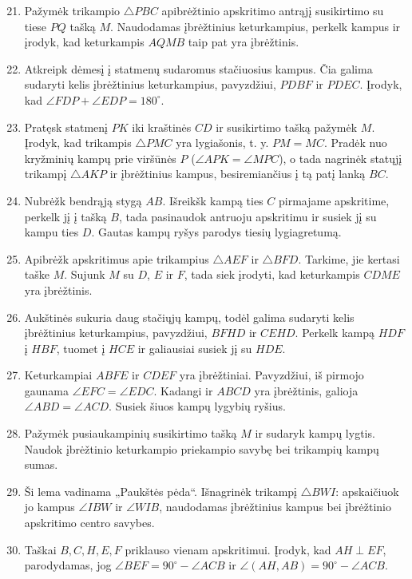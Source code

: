 \documentclass[11pt,a4paper]{scrartcl}
\begin{document}
\begin{enumerate}
    \setcounter{enumi}{20}
    \item Pažymėk trikampio $\triangle PBC$ apibrėžtinio apskritimo antrąjį susikirtimo su tiese $PQ$ tašką $M$. Naudodamas įbrėžtinius keturkampius, perkelk kampus ir įrodyk, kad keturkampis $AQMB$ taip pat yra įbrėžtinis.
    \item Atkreipk dėmesį į statmenų sudaromus stačiuosius kampus. Čia galima sudaryti kelis įbrėžtinius keturkampius, pavyzdžiui, $PDBF$ ir $PDEC$. Įrodyk, kad $\angle FDP+\angle EDP=180^\circ$.
    \item Pratęsk statmenį $PK$ iki kraštinės $CD$ ir susikirtimo tašką pažymėk $M$. Įrodyk, kad trikampis $\triangle PMC$ yra lygiašonis, t. y. $PM=MC$. Pradėk nuo kryžminių kampų prie viršūnės $P$ ($\angle APK=\angle MPC$), o tada nagrinėk statųjį trikampį $\triangle AKP$ ir įbrėžtinius kampus, besiremiančius į tą patį lanką $BC$.
    \item Nubrėžk bendrąją stygą $AB$. Išreikšk kampą ties $C$ pirmajame apskritime, perkelk jį į tašką $B$, tada pasinaudok antruoju apskritimu ir susiek jį su kampu ties $D$. Gautas kampų ryšys parodys tiesių lygiagretumą.
    \item Apibrėžk apskritimus apie trikampius $\triangle AEF$ ir $\triangle BFD$. Tarkime, jie kertasi taške $M$. Sujunk $M$ su $D$, $E$ ir $F$, tada siek įrodyti, kad keturkampis $CDME$ yra įbrėžtinis.
    \item Aukštinės sukuria daug stačiųjų kampų, todėl galima sudaryti kelis įbrėžtinius keturkampius, pavyzdžiui, $BFHD$ ir $CEHD$. Perkelk kampą $HDF$ į $HBF$, tuomet į $HCE$ ir galiausiai susiek jį su $HDE$.
    \item Keturkampiai $ABFE$ ir $CDEF$ yra įbrėžtiniai. Pavyzdžiui, iš pirmojo gaunama $\angle EFC=\angle EDC$. Kadangi ir $ABCD$ yra įbrėžtinis, galioja $\angle ABD=\angle ACD$. Susiek šiuos kampų lygybių ryšius.
    \item Pažymėk pusiaukampinių susikirtimo tašką $M$ ir sudaryk kampų lygtis. Naudok įbrėžtinio keturkampio priekampio savybę bei trikampių kampų sumas.
    \item Ši lema vadinama „Paukštės pėda“. Išnagrinėk trikampį $\triangle BWI$: apskaičiuok jo kampus $\angle IBW$ ir $\angle WIB$, naudodamas įbrėžtinius kampus bei įbrėžtinio apskritimo centro savybes.
    \item Taškai $B,C,H,E,F$ priklauso vienam apskritimui. Įrodyk, kad $AH\perp EF$, parodydamas, jog $\angle BEF=90^\circ-\angle ACB$ ir $\angle (AH,AB)=90^\circ-\angle ACB$.
\end{enumerate}
\end{document}
